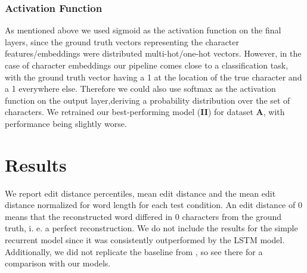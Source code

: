 \subsubsection{Activation Function}
As mentioned above we used sigmoid as the activation function on the final layers, since the ground truth vectors representing the character features/embeddings were distributed multi-hot/one-hot vectors. However, in the case of character embeddings our pipeline comes close to a classification task, with the ground truth vector having a 1 at the location of the true character and a 1 everywhere else. Therefore we could also use softmax as the activation function on the output layer,deriving a probability distribution over the set of characters. We retrained our best-performing model (\textbf{II}) for dataset \textbf{A}, with performance being slightly worse.

\newpage
\section{Results}
We report edit distance percentiles, mean edit distance and the mean edit distance normalized for word length for each test condition. An edit distance of 0 means that the reconstructed word differed in 0 characters from the ground truth, i. e. a perfect reconstruction. We do not include the results for the simple recurrent model since it was consistently outperformed by the LSTM model. Additionally, we did not replicate the baseline from \cite{meloni2019ab}, so see there for a comparison with our models.


